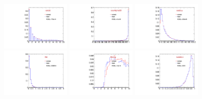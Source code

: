 \begin{figure}
  \centering
  \includegraphics[width=0.3\textwidth]{Figures/VariablesComparison/MC_barrel_figs/closetrk}
  \includegraphics[width=0.3\textwidth]{Figures/VariablesComparison/MC_barrel_figs/cosa}
  \includegraphics[width=0.3\textwidth]{Figures/VariablesComparison/MC_barrel_figs/docatrk}
  \includegraphics[width=0.3\textwidth]{Figures/VariablesComparison/MC_barrel_figs/fl3d}
  \includegraphics[width=0.3\textwidth]{Figures/VariablesComparison/MC_barrel_figs/fls3d}
  \includegraphics[width=0.3\textwidth]{Figures/VariablesComparison/MC_barrel_figs/iso}

\end{figure}
